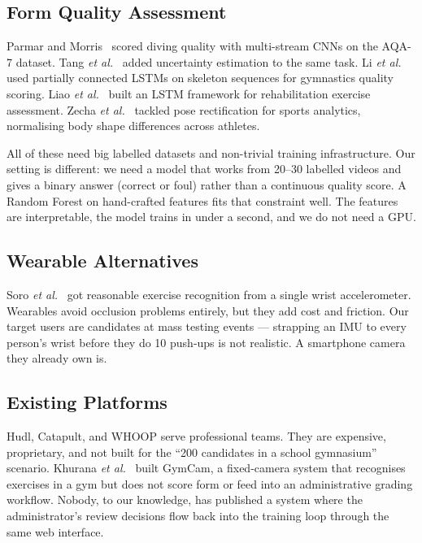 \documentclass[conference]{IEEEtran}
\begin{document}
\subsection{Form Quality Assessment}
Parmar and Morris~\cite{parmar2019} scored diving quality with multi-stream CNNs on the AQA-7 dataset. Tang \textit{et al.}~\cite{tang2020} added uncertainty estimation to the same task. Li \textit{et al.}~\cite{li2023} used partially connected LSTMs on skeleton sequences for gymnastics quality scoring. Liao \textit{et al.}~\cite{liao2020} built an LSTM framework for rehabilitation exercise assessment. Zecha \textit{et al.}~\cite{zecha2019} tackled pose rectification for sports analytics, normalising body shape differences across athletes.

All of these need big labelled datasets and non-trivial training infrastructure. Our setting is different: we need a model that works from 20--30 labelled videos and gives a binary answer (correct or foul) rather than a continuous quality score. A Random Forest on hand-crafted features fits that constraint well. The features are interpretable, the model trains in under a second, and we do not need a GPU.

\subsection{Wearable Alternatives}
Soro \textit{et al.}~\cite{soro2019} got reasonable exercise recognition from a single wrist accelerometer. Wearables avoid occlusion problems entirely, but they add cost and friction. Our target users are candidates at mass testing events --- strapping an IMU to every person's wrist before they do 10 push-ups is not realistic. A smartphone camera they already own is.

\subsection{Existing Platforms}
Hudl, Catapult, and WHOOP serve professional teams. They are expensive, proprietary, and not built for the ``200 candidates in a school gymnasium'' scenario. Khurana \textit{et al.}~\cite{khurana2018} built GymCam, a fixed-camera system that recognises exercises in a gym but does not score form or feed into an administrative grading workflow. Nobody, to our knowledge, has published a system where the administrator's review decisions flow back into the training loop through the same web interface.

\end{document}
